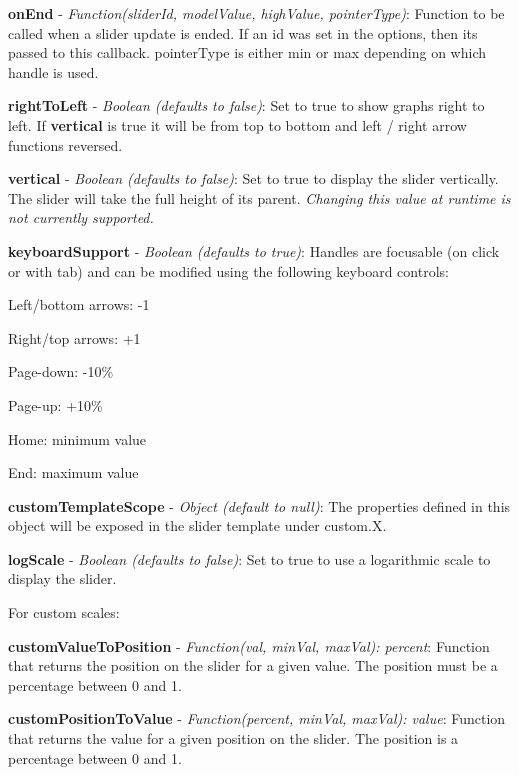 {\bfseries on\+End} -\/ {\itshape Function(slider\+Id, model\+Value, high\+Value, pointer\+Type)}\+: Function to be called when a slider update is ended. If an id was set in the options, then it\textquotesingle{}s passed to this callback. {\ttfamily pointer\+Type} is either \textquotesingle{}min\textquotesingle{} or \textquotesingle{}max\textquotesingle{} depending on which handle is used.

{\bfseries right\+To\+Left} -\/ {\itshape Boolean (defaults to false)}\+: Set to true to show graphs right to left. If {\bfseries vertical} is true it will be from top to bottom and left / right arrow functions reversed.

{\bfseries vertical} -\/ {\itshape Boolean (defaults to false)}\+: Set to true to display the slider vertically. The slider will take the full height of its parent. {\itshape Changing this value at runtime is not currently supported.}

{\bfseries keyboard\+Support} -\/ {\itshape Boolean (defaults to true)}\+: Handles are focusable (on click or with tab) and can be modified using the following keyboard controls\+:
\begin{DoxyItemize}
\item Left/bottom arrows\+: -\/1
\item Right/top arrows\+: +1
\item Page-\/down\+: -\/10\%
\item Page-\/up\+: +10\%
\item Home\+: minimum value
\item End\+: maximum value
\end{DoxyItemize}

{\bfseries custom\+Template\+Scope} -\/ {\itshape Object (default to null)}\+: The properties defined in this object will be exposed in the slider template under {\ttfamily custom.\+X}.

{\bfseries log\+Scale} -\/ {\itshape Boolean (defaults to false)}\+: Set to true to use a logarithmic scale to display the slider.

For custom scales\+:

{\bfseries custom\+Value\+To\+Position} -\/ {\itshape Function(val, min\+Val, max\+Val)\+: percent}\+: Function that returns the position on the slider for a given value. The position must be a percentage between 0 and 1.

{\bfseries custom\+Position\+To\+Value} -\/ {\itshape Function(percent, min\+Val, max\+Val)\+: value}\+: Function that returns the value for a given position on the slider. The position is a percentage between 0 and 1.

